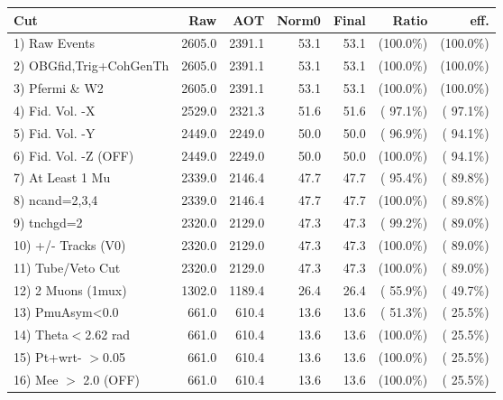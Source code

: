  \begin{table}[h!]\centering
 \begin{tabular}{||l||r|r|r|r|r|r||}
 \hline
 \hline
 Cut & Raw & AOT & Norm0 & Final & Ratio & eff.       \\
 \hline
  1) Raw Events           &       2605.0 &       2391.1 &         53.1 &         53.1 & (100.0\%) & (100.0\%) \\
  2) OBGfid,Trig+CohGenTh &       2605.0 &       2391.1 &         53.1 &         53.1 & (100.0\%) & (100.0\%) \\
  3) Pfermi \& W2         &       2605.0 &       2391.1 &         53.1 &         53.1 & (100.0\%) & (100.0\%) \\
  4) Fid. Vol. -X         &       2529.0 &       2321.3 &         51.6 &         51.6 & ( 97.1\%) & ( 97.1\%) \\
  5) Fid. Vol. -Y         &       2449.0 &       2249.0 &         50.0 &         50.0 & ( 96.9\%) & ( 94.1\%) \\
  6) Fid. Vol. -Z (OFF)   &       2449.0 &       2249.0 &         50.0 &         50.0 & (100.0\%) & ( 94.1\%) \\
  7) At Least 1 Mu        &       2339.0 &       2146.4 &         47.7 &         47.7 & ( 95.4\%) & ( 89.8\%) \\
  8) ncand=2,3,4          &       2339.0 &       2146.4 &         47.7 &         47.7 & (100.0\%) & ( 89.8\%) \\
  9) tnchgd=2             &       2320.0 &       2129.0 &         47.3 &         47.3 & ( 99.2\%) & ( 89.0\%) \\
 10) +/- Tracks (V0)      &       2320.0 &       2129.0 &         47.3 &         47.3 & (100.0\%) & ( 89.0\%) \\
 11) Tube/Veto Cut        &       2320.0 &       2129.0 &         47.3 &         47.3 & (100.0\%) & ( 89.0\%) \\
 12) 2 Muons (1mux)       &       1302.0 &       1189.4 &         26.4 &         26.4 & ( 55.9\%) & ( 49.7\%) \\
 13) PmuAsym<0.0          &        661.0 &        610.4 &         13.6 &         13.6 & ( 51.3\%) & ( 25.5\%) \\
 14) Theta$<$2.62 rad     &        661.0 &        610.4 &         13.6 &         13.6 & (100.0\%) & ( 25.5\%) \\
 15) Pt+wrt- $>$0.05      &        661.0 &        610.4 &         13.6 &         13.6 & (100.0\%) & ( 25.5\%) \\
 16) Mee $>$ 2.0  (OFF)   &        661.0 &        610.4 &         13.6 &         13.6 & (100.0\%) & ( 25.5\%) \\

\end{tabular}
\end{table}
